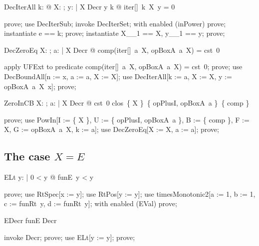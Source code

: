 \documentclass{article}
\begin{document}
\begin{theorem}{DecIterAll}
  \forall k: \nat @ \forall X: \nat \fun \nat; y: \nat | X \in Decr \land y \leq k @ iter[\nat]~k~X~y = 0
\end{theorem}

\begin{zproof}
prove;
use DecIterSub;
invoke DecIterSet;
with enabled (inPower) prove;
instantiate e == k;
prove;
instantiate X\_\_1 == X, y\_\_1 == y;
prove;
\end{zproof}

\begin{theorem}{DecZeroEq}
  \forall X: \nat \fun \nat; a: \nat | X \in Decr @ comp(iter[\nat]~a~X, opBoxA~a~X) = cst~0
\end{theorem}

\begin{zproof}
apply UFExt to predicate comp(iter[\nat]~a~X, opBoxA~a~X) = cst~0;
prove;
use DecBoundAll[n := x, a := a, X := X];
use DecIterAll[k := a, X := X, y := opBoxA~a~X~x];
prove;
\end{zproof}

\begin{theorem}{ZeroInCB}
  \forall X: \nat \fun \nat; a: \nat | X \in Decr @ cst~0 \in clos~\{ X \}~\{ opPlusI, opBoxA~a \}~\{ comp \}
\end{theorem}

\begin{zproof}
prove;
use PowIn[I := \{ X \}, U := \{ opPlusI, opBoxA~a \}, B := \{ comp \}, F := X, G := opBoxA~a~X, k := a];
use DecZeroEq[X := X, a := a];
prove;
\end{zproof}

\subsection{The case $X = E$}

\begin{theorem}{ELt}
  \forall y: \nat | 0 < y @ funE~y < y
\end{theorem}

\begin{zproof}
prove;
use RtSpec[x := y];
use RtPos[y := y];
use timesMonotonic2[a := 1, b := 1, c := funRt~y, d := funRt~y];
with enabled (EVal) prove;
\end{zproof}

\begin{theorem}{EDecr}
  funE \in Decr
\end{theorem}

\begin{zproof}
invoke Decr;
prove;
use ELt[y := y];
prove;
\end{zproof}
\end{document}
